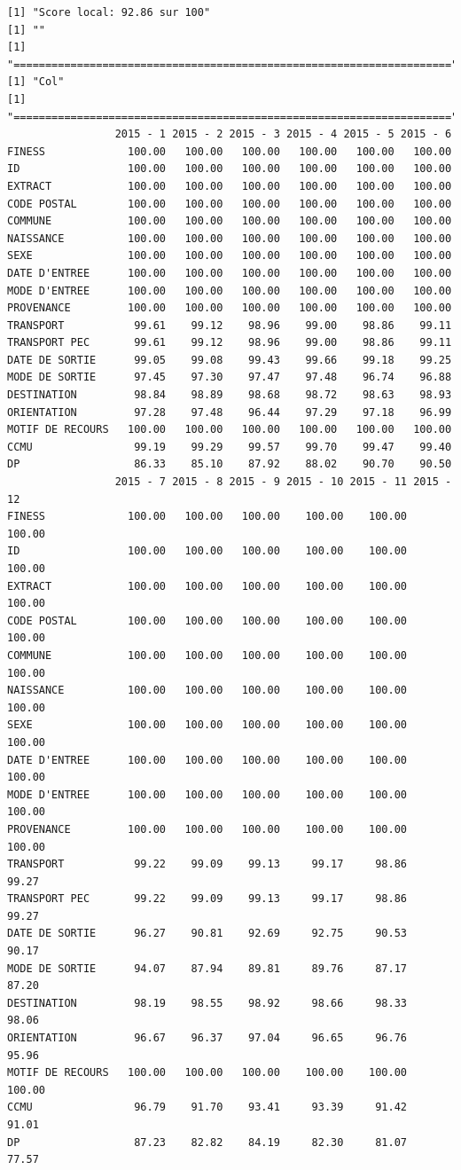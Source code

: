 \documentclass[]{article}
\begin{document}
\begin{verbatim}
[1] "Score local: 92.86 sur 100"
[1] ""
[1] "====================================================================="
[1] "Col"
[1] "====================================================================="
                 2015 - 1 2015 - 2 2015 - 3 2015 - 4 2015 - 5 2015 - 6
FINESS             100.00   100.00   100.00   100.00   100.00   100.00
ID                 100.00   100.00   100.00   100.00   100.00   100.00
EXTRACT            100.00   100.00   100.00   100.00   100.00   100.00
CODE POSTAL        100.00   100.00   100.00   100.00   100.00   100.00
COMMUNE            100.00   100.00   100.00   100.00   100.00   100.00
NAISSANCE          100.00   100.00   100.00   100.00   100.00   100.00
SEXE               100.00   100.00   100.00   100.00   100.00   100.00
DATE D'ENTREE      100.00   100.00   100.00   100.00   100.00   100.00
MODE D'ENTREE      100.00   100.00   100.00   100.00   100.00   100.00
PROVENANCE         100.00   100.00   100.00   100.00   100.00   100.00
TRANSPORT           99.61    99.12    98.96    99.00    98.86    99.11
TRANSPORT PEC       99.61    99.12    98.96    99.00    98.86    99.11
DATE DE SORTIE      99.05    99.08    99.43    99.66    99.18    99.25
MODE DE SORTIE      97.45    97.30    97.47    97.48    96.74    96.88
DESTINATION         98.84    98.89    98.68    98.72    98.63    98.93
ORIENTATION         97.28    97.48    96.44    97.29    97.18    96.99
MOTIF DE RECOURS   100.00   100.00   100.00   100.00   100.00   100.00
CCMU                99.19    99.29    99.57    99.70    99.47    99.40
DP                  86.33    85.10    87.92    88.02    90.70    90.50
                 2015 - 7 2015 - 8 2015 - 9 2015 - 10 2015 - 11 2015 - 12
FINESS             100.00   100.00   100.00    100.00    100.00    100.00
ID                 100.00   100.00   100.00    100.00    100.00    100.00
EXTRACT            100.00   100.00   100.00    100.00    100.00    100.00
CODE POSTAL        100.00   100.00   100.00    100.00    100.00    100.00
COMMUNE            100.00   100.00   100.00    100.00    100.00    100.00
NAISSANCE          100.00   100.00   100.00    100.00    100.00    100.00
SEXE               100.00   100.00   100.00    100.00    100.00    100.00
DATE D'ENTREE      100.00   100.00   100.00    100.00    100.00    100.00
MODE D'ENTREE      100.00   100.00   100.00    100.00    100.00    100.00
PROVENANCE         100.00   100.00   100.00    100.00    100.00    100.00
TRANSPORT           99.22    99.09    99.13     99.17     98.86     99.27
TRANSPORT PEC       99.22    99.09    99.13     99.17     98.86     99.27
DATE DE SORTIE      96.27    90.81    92.69     92.75     90.53     90.17
MODE DE SORTIE      94.07    87.94    89.81     89.76     87.17     87.20
DESTINATION         98.19    98.55    98.92     98.66     98.33     98.06
ORIENTATION         96.67    96.37    97.04     96.65     96.76     95.96
MOTIF DE RECOURS   100.00   100.00   100.00    100.00    100.00    100.00
CCMU                96.79    91.70    93.41     93.39     91.42     91.01
DP                  87.23    82.82    84.19     82.30     81.07     77.57
\end{verbatim}
\end{document}
